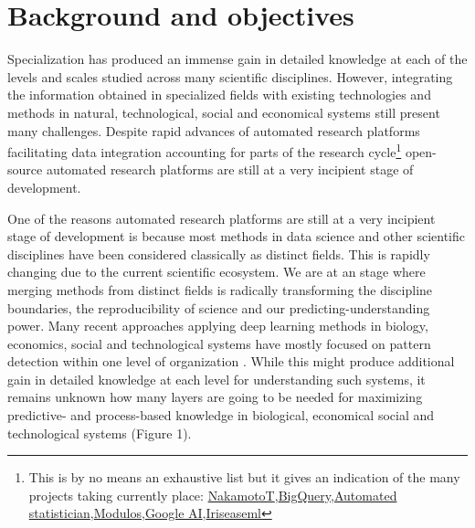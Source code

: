 \documentclass[authoryear,1p,12pt]{elsarticle}
\begin{document}
\newpage

\section{Background and objectives}

Specialization has produced an immense gain in detailed knowledge at
each of the levels and scales studied across many scientific
disciplines. However, integrating the information obtained in
specialized fields with existing technologies and methods in natural,
technological, social and economical systems still present many
challenges. Despite rapid advances of automated research platforms
facilitating data integration accounting for parts of the research
cycle\footnote{This is by no means an exhaustive list but it gives an
  indication of the many projects taking currently place:
  \href{https://www.nterminal.com}{NakamotoT},\href{https://cloud.google.com/bigquery/}{BigQuery},\href{https://www.automaticstatistician.com/index/}{Automated
    statistician},\href{http://www.modulos.ai/}{Modulos},\href{https://ai.google/}{Google
    AI},\href{https://iris.ai}{Iris}\href{https://github.com/DS3Lab/easeml}{easeml}}
open-source automated research platforms are still at a very incipient
stage of development.

One of the reasons automated research platforms are still at a very
incipient stage of development is because most methods in data science
and other scientific disciplines have been considered classically as
distinct fields. This is rapidly changing due to the current
scientific ecosystem. We are at an stage where merging methods from
distinct fields is radically transforming the discipline boundaries,
the reproducibility of science and our predicting-understanding
power\citep{Reichsteietal2019}. Many recent approaches applying deep
learning methods in biology, economics, social and technological
systems have mostly focused on pattern detection within one level of
organization \citep{Sheehan&Song:2016}. While this might produce
additional gain in detailed knowledge at each level for understanding
such systems, it remains unknown how many layers are going to be
needed for maximizing predictive- and process-based knowledge in
biological, economical social and technological systems (Figure 1).
\end{document}
